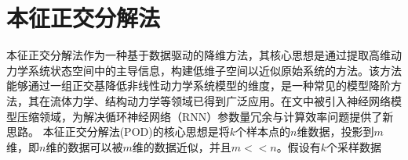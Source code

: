 


\section{本征正交分解法}
本征正交分解法\cite{nomuraStructureInhomogeneousTurbulence1993}作为一种基于数据驱动的降维方法，其核心思想是通过提取高维动力学系统状态空间中的主导信息，构建低维子空间以近似原始系统的方法。该方法能够通过一组正交基降低非线性动力学系统模型的维度，是一种常见的模型降阶方法，其在流体力学、结构动力学等领域已得到广泛应用。在文中被引入神经网络模型压缩领域，为解决循环神经网络（RNN）参数量冗余与计算效率问题提供了新思路。
本征正交分解法(POD)的核心思想是将$k$个样本点的$n$维数据，投影到$m$维，即$n$维的数据可以被$m$维的数据近似，并且$m<<n$。假设有$k$个采样数据

